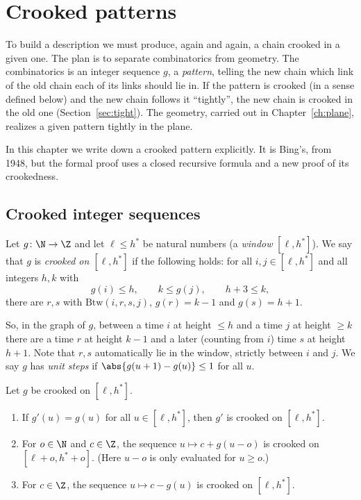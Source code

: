 \chapter{Crooked patterns}\label{ch:patterns}

To build a description we must produce, again and again, a chain crooked in a given one. The
plan is to separate combinatorics from geometry. The combinatorics is an integer sequence
$g$, a \emph{pattern}, telling the new chain which link of the old chain each of its links
should lie in. If the pattern is crooked (in a sense defined below) and the new chain follows
it ``tightly'', the new chain is crooked in the old one (Section~\ref{sec:tight}). The
geometry, carried out in Chapter~\ref{ch:plane}, realizes a given pattern tightly in the plane.

In this chapter we write down a crooked pattern explicitly. It is Bing's, from 1948, but the
formal proof uses a closed recursive formula and a new proof of its crookedness.

\section{Crooked integer sequences}

\begin{definition}\label{def:pattern-crooked}
Let $g\colon\N\to\Z$ and let $\ell\le h^{*}$ be natural numbers (a \emph{window}
$[\ell,h^{*}]$). We say that $g$ is \emph{crooked on $[\ell,h^{*}]$} if the following holds:
for all $i,j\in[\ell,h^{*}]$ and all integers $h,k$ with
\[
g(i)\le h,\qquad k\le g(j),\qquad h+3\le k,
\]
there are $r,s$ with $\mathrm{Btw}(i,r,s,j)$, $g(r)=k-1$ and $g(s)=h+1$.
\end{definition}

So, in the graph of $g$, between a time $i$ at height $\le h$ and a time $j$ at height $\ge k$
there are a time $r$ at height $k-1$ and a later (counting from $i$) time $s$ at height $h+1$.
Note that $r,s$ automatically lie in the window, strictly between $i$ and $j$. We say $g$ has
\emph{unit steps} if $\abs{g(u+1)-g(u)}\le1$ for all $u$.


\begin{lemma}\label{lem:pattern-ops}
Let $g$ be crooked on $[\ell,h^*]$.
\begin{enumerate}[label=(\alph*)]
\item\label{po:congr} If $g'(u)=g(u)$ for all $u\in[\ell,h^*]$, then $g'$ is crooked on
$[\ell,h^*]$.
\item\label{po:shift} For $o\in\N$ and $c\in\Z$, the sequence $u\mapsto c+g(u-o)$ is crooked on
$[\ell+o,h^*+o]$. (Here $u-o$ is only evaluated for $u\ge o$.)
\item\label{po:neg} For $c\in\Z$, the sequence $u\mapsto c-g(u)$ is crooked on $[\ell,h^*]$.
\end{enumerate}
\end{lemma}

